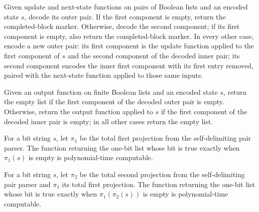 \begin{definition}
\label{Complexity.BlockLoop.step}
\leanok
{}
Given update and next-state functions on pairs of Boolean lists and an encoded state
$s$, decode its outer pair. If the first component is empty, return the completed-block
marker. Otherwise, decode the second component; if its first component is empty, also
return the completed-block marker. In every other case, encode a new outer pair: its
first component is the update function applied to the first component of $s$ and the
second component of the decoded inner pair; its second component encodes the inner first
component with its first entry removed, paired with the next-state function applied to
those same inputs.
\end{definition}

\begin{definition}
\label{Complexity.BlockLoop.emit}
\leanok
{}
Given an output function on finite Boolean lists and an encoded state $s$, return the
empty list if the first component of the decoded outer pair is empty. Otherwise, return
the output function applied to $s$ if the first component of the decoded inner pair is
empty; in all other cases return the empty list.
\end{definition}

\begin{theorem}
\label{Complexity.BlockLoop.polyTimeComputable_headNil}
\leanok
{}
For a bit string $s$, let $\pi_1$ be the total first projection from the self-delimiting
pair parser. The function returning the one-bit list whose bit is true exactly when
$\pi_1(s)$ is empty is polynomial-time computable.
\end{theorem}

\begin{theorem}
\label{Complexity.BlockLoop.polyTimeComputable_countdownNil}
\leanok
{}
For a bit string $s$, let $\pi_2$ be the total second projection from the
self-delimiting pair parser and $\pi_1$ its total first projection. The function
returning the one-bit list whose bit is true exactly when $\pi_1(\pi_2(s))$ is empty is
polynomial-time computable.
\end{theorem}

